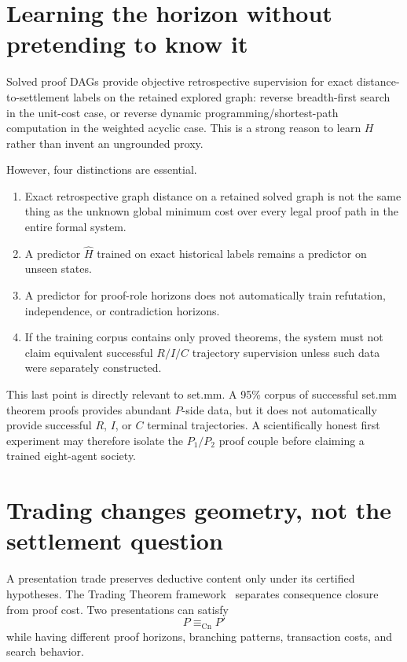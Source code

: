 \documentclass[11pt]{article}
\theoremstyle{definition}
\theoremstyle{remark}
\newcommand{\Cn}{\operatorname{Cn}}
\begin{document}
\section{Learning the horizon without pretending to know it}

Solved proof DAGs provide objective retrospective supervision for exact distance-to-settlement labels on the retained explored graph: reverse breadth-first search in the unit-cost case, or reverse dynamic programming/shortest-path computation in the weighted acyclic case. This is a strong reason to learn $H$ rather than invent an ungrounded proxy.

However, four distinctions are essential.
\begin{enumerate}
\item Exact retrospective graph distance on a retained solved graph is not the same thing as the unknown global minimum cost over every legal proof path in the entire formal system.
\item A predictor $\widehat H$ trained on exact historical labels remains a predictor on unseen states.
\item A predictor for proof-role horizons does not automatically train refutation, independence, or contradiction horizons.
\item If the training corpus contains only proved theorems, the system must not claim equivalent successful $R/I/C$ trajectory supervision unless such data were separately constructed.
\end{enumerate}

This last point is directly relevant to set.mm. A 95\% corpus of successful set.mm theorem proofs provides abundant $P$-side data, but it does not automatically provide successful $R$, $I$, or $C$ terminal trajectories. A scientifically honest first experiment may therefore isolate the $P_1/P_2$ proof couple before claiming a trained eight-agent society.

\section{Trading changes geometry, not the settlement question}

A presentation trade preserves deductive content only under its certified hypotheses. The Trading Theorem framework~\cite{trading,tradingdensity} separates consequence closure from proof cost. Two presentations can satisfy
\[
P\equiv_{\Cn}P'
\]
while having different proof horizons, branching patterns, transaction costs, and search behavior.
\end{document}
